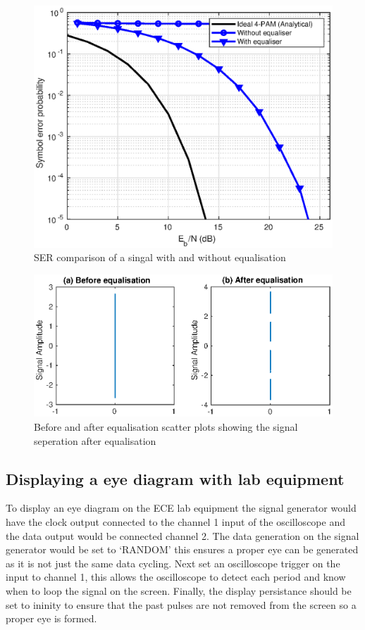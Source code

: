 \begin{figure}[H]
    \begin{center}
        \includegraphics{Equaliser/ber}
    \end{center}
    \caption{SER comparison of a singal with and without equalisation}
    \label{fig:equ-ser}
\end{figure}

\begin{figure}[H]
    \begin{center}
        \includegraphics{Equaliser/scatter}
    \end{center}
    \caption{Before and after equalisation scatter plots showing the signal seperation after equalisation}
    \label{fig:equ-scatter}
\end{figure}

\subsection{Displaying a eye diagram with lab equipment}
To display an eye diagram on the ECE lab equipment the signal generator would have the clock output connected to the channel 1
input of the oscilloscope and the data output would be connected channel 2. The data generation on the signal generator would
be set to `RANDOM' this ensures a proper eye can be generated as it is not just the same data cycling. Next set an oscilloscope
trigger on the input to channel 1, this allows the oscilloscope to detect each period and know when to loop the signal on the screen.
Finally, the display persistance should be set to ininity to ensure that the past pulses are not removed from the screen so a proper
eye is formed.
